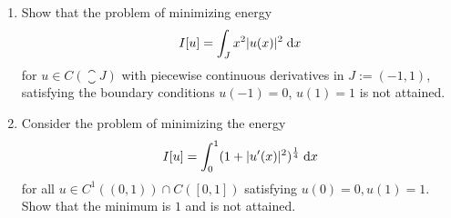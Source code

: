 \begin{enumerate}
\item
  Show that the problem of minimizing energy
  $$
  I[u] = \int_J x^2 |u(x)|^2 \;\mathrm{d}x
  $$
  for $u \in C(\closure{J})$ with piecewise continuous derivatives in $J := (-1, 1)$, satisfying the boundary conditions $u(-1) = 0$, $u(1) = 1$ is not attained.
\item
  Consider the problem of minimizing the energy
  $$
  I[u] = \int_0^1 (1 + |u'(x)|^2)^{\frac{1}{4}} \;\mathrm{d}x
  $$
  for all $u \in C^1((0, 1)) \cap C([0, 1])$ satisfying $u(0) = 0, u(1) = 1$. Show that the minimum is $1$ and is not attained.
\end{enumerate}
